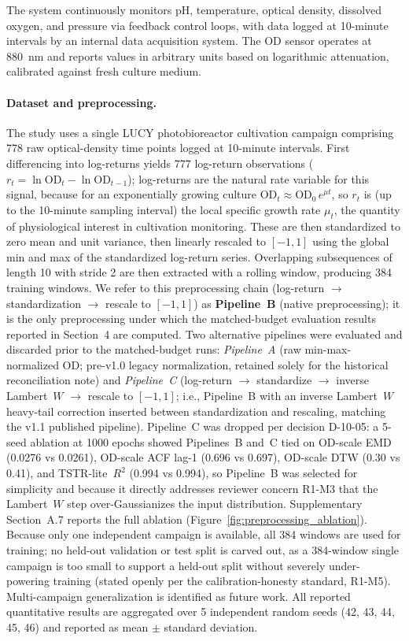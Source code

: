 \documentclass[12pt,twocolumn]{article}
\begin{document}
The system continuously monitors pH, temperature, optical density, dissolved oxygen, and pressure via feedback control loops, with data logged at 10-minute intervals by an internal data acquisition system. The OD sensor operates at 880~nm and reports values in arbitrary units based on logarithmic attenuation, calibrated against fresh culture medium.

\paragraph{Dataset and preprocessing.}
The study uses a single LUCY photobioreactor cultivation campaign
comprising 778 raw optical-density time points logged at 10-minute intervals.
First differencing into log-returns yields 777 log-return observations
($r_t = \ln \mathrm{OD}_t - \ln \mathrm{OD}_{t-1}$); log-returns are the
natural rate variable for this signal, because for an exponentially growing
culture $\mathrm{OD}_t \approx \mathrm{OD}_0\,e^{\mu t}$, so $r_t$ is (up to
the 10-minute sampling interval) the local specific growth rate $\mu_t$, the
quantity of physiological interest in cultivation monitoring.
These are then standardized to zero mean and unit variance, then linearly
rescaled to $[-1, 1]$ using the global min and max of the standardized
log-return series.
Overlapping subsequences of length 10 with stride 2 are then extracted with a
rolling window, producing 384 training windows. We refer to this preprocessing
chain (log-return $\to$ standardization $\to$ rescale to $[-1, 1]$) as
\textbf{Pipeline~B} (native preprocessing); it is the only preprocessing
under which the matched-budget evaluation results reported in Section~4 are
computed. Two alternative pipelines were evaluated and discarded prior to
the matched-budget runs: \emph{Pipeline~A} (raw min-max-normalized OD; pre-v1.0
legacy normalization, retained solely for the historical reconciliation note)
and \emph{Pipeline~C} (log-return $\to$ standardize $\to$ inverse
Lambert~$W$ $\to$ rescale to $[-1, 1]$; i.e., Pipeline~B with an inverse
Lambert~$W$ heavy-tail correction inserted between standardization and
rescaling, matching the v1.1 published pipeline). Pipeline~C was dropped
per decision D-10-05: a 5-seed ablation at 1000 epochs showed Pipelines~B
and~C tied on OD-scale EMD (0.0276 vs 0.0261), OD-scale ACF lag-1 (0.696 vs
0.697), OD-scale DTW (0.30 vs 0.41), and TSTR-lite~$R^2$ (0.994 vs 0.994),
so Pipeline~B was selected for simplicity and because it directly addresses
reviewer concern R1-M3 that the Lambert~$W$ step over-Gaussianizes the input
distribution. Supplementary Section~A.7 reports the full ablation
(Figure~\ref{fig:preprocessing_ablation}).
Because only one independent campaign is available, all 384 windows are used for
training; no held-out validation or test split is carved out, as a 384-window
single campaign is too small to support a held-out split without severely
under-powering training (stated openly per the calibration-honesty standard,
R1-M5). Multi-campaign generalization is identified as future work.
All reported quantitative results are aggregated over 5 independent random
seeds (42, 43, 44, 45, 46) and reported as mean $\pm$ standard deviation.
\end{document}
